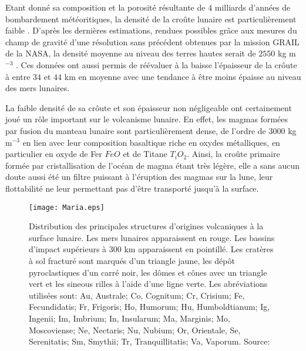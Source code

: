 Etant donné sa composition et  la porosité résultante de $4$ milliards
d'années  de  bombardement  météoritiques,  la densité  de  la  croûte
lunaire  est particulièrement  faible \citep{Huang:2012gf,Han:2014ic}.
D'après les dernières estimations, rendues possibles grâce aux mesures
du champ  de gravité d'une  résolution sans précédent obtenues  par la
mission GRAIL  de la  NASA, la  densité moyenne  au niveau  des terres
hautes serait  de $2550$  kg m$^{-3}$  \citep{Wieczorek:2013ipa}.  Ces
données ont  aussi permis de réévaluer  à la baisse l'épaisseur  de la
crôute à  entre $34$ et  $44$ km en moyenne  avec une tendance  à être
moins épaisse au niveau des mers lunaires.

La faible  densité de sa crôute  et son épaisseur non  négligeable ont
certainement joué  un rôle  important sur  le volcanisme  lunaire.  En
effet,  les  magmas  formées  par   fusion  du  manteau  lunaire  sont
particulièrement   dense,   de   l'ordre   de   $3000$   kg   m$^{-3}$
\citep{Kiefer:2012kp} en  lien avec leur composition  basaltique riche
en oxydes  métalliques, en  particulier en  oxyde de  Fer $FeO$  et de
Titane $T_iO_2$. Ainsi, la  croûte primaire formée par cristallisation
de l'océan de  magma étant très légère, elle a  sans aucun doute aussi
été  un filtre  puissant à  l'éruption des  magmas sur  la lune,  leur
flottabilité  ne  leur permettant  pas  d'être  transporté jusqu'à  la
surface.

\begin{figure}[h!]
  \begin{center}
    \graphicspath{ {/Users/thorey/Documents/These/Manuscript/Figure/Chapter1/} }
    \texttt{[image: Maria.eps]}
    \caption{Distribution   des   principales  structures   d'origines
      volcaniques   à  la   surface   lunaire.    Les  mers   lunaires
      apparaissent en  rouge. Les bassins d'impact  supérieurs à $300$
      km apparaissent en pointillé.  Les  cratères à sol fracturé sont
      marqués d'un triangle jaune, les dépôt pyroclastiques d'un carré
      noir, les  dômes et cônes avec  un triangle vert et  les sineous
      rilles à  l'aide d'une  ligne verte. Les  abréviations utilisées
      sont: Au, Australe; Co, Cognitum; Cr, Crisium; Fe, Fecundidatis;
      Fr, Frigoris;  Ho, Humorum; Hu, Humboldtianum;  Ig, Ingenii; Im,
      Imbrium;  In,  Insularum;  Ma, Marginis;  Mo,  Moscoviense;  Ne,
      Nectaris;  Nu,  Nubium;  Or,  Orientale,  Se,  Serenitatis;  Sm,
      Smythii;    Tr,    Tranquillitatis;   Va,    Vaporum.    Source:
      \citet{Platz:2015ex}}
    \label{Maria}
  \end{center}
\end{figure}


